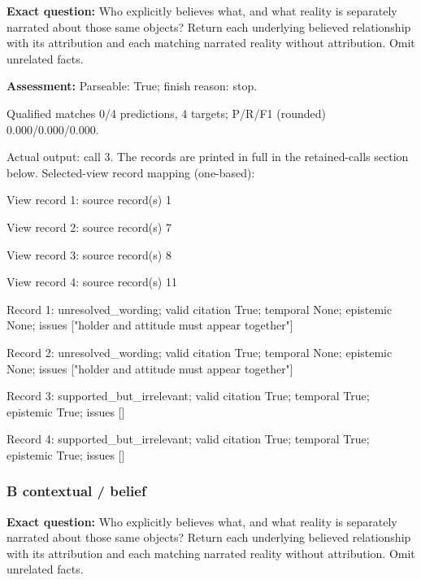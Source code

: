 \noindent\textbf{Exact question:} Who explicitly believes what, and what reality is separately narrated about those same objects? Return each underlying believed relationship with its attribution and each matching narrated reality without attribution. Omit unrelated facts.\par

\noindent\textbf{Assessment:} Parseable: True; finish reason: stop.

Qualified matches 0/4 predictions, 4 targets; P/R/F1 (rounded) 0.000/0.000/0.000.\par

Actual output: call 3. The records are printed in full in the retained-calls section below. Selected-view record mapping (one-based):

View record 1: source record(s) 1\par

View record 2: source record(s) 7\par

View record 3: source record(s) 8\par

View record 4: source record(s) 11\par

Record 1: unresolved\_wording; valid citation True; temporal None; epistemic None; issues ["holder and attitude must appear together"]\par

Record 2: unresolved\_wording; valid citation True; temporal None; epistemic None; issues ["holder and attitude must appear together"]\par

Record 3: supported\_but\_irrelevant; valid citation True; temporal True; epistemic True; issues []\par

Record 4: supported\_but\_irrelevant; valid citation True; temporal True; epistemic True; issues []\par

\subsubsection*{B contextual / belief}

\noindent\textbf{Exact question:} Who explicitly believes what, and what reality is separately narrated about those same objects? Return each underlying believed relationship with its attribution and each matching narrated reality without attribution. Omit unrelated facts.\par

